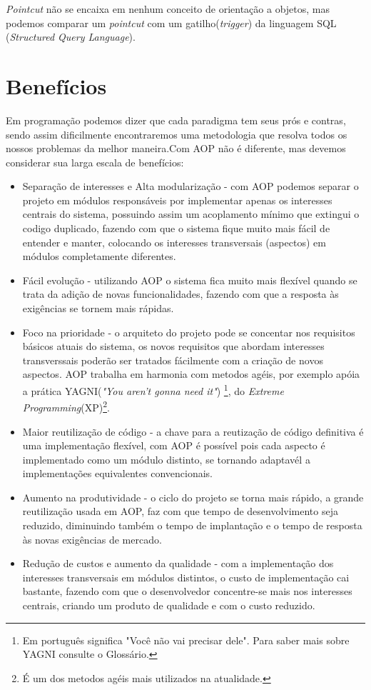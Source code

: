 \documentclass[tc,openright]{iiufrgs}
\begin{document}
\textit{Pointcut} não se encaixa em nenhum conceito de orientação a objetos, mas podemos comparar um \textit{pointcut} com um gatilho(\textit{trigger}) da linguagem SQL (\textit{Structured Query Language}).

\section{Benefícios}

Em programação podemos dizer que cada paradigma tem seus prós e contras, sendo assim dificilmente encontraremos uma metodologia que resolva todos os nossos problemas da melhor maneira.Com AOP não é diferente, mas devemos considerar sua larga escala de benefícios:

\begin{itemize}
\item Separação de interesses e Alta modularização - com AOP podemos separar o projeto em módulos responsáveis por implementar apenas os interesses centrais do sistema, possuindo assim um acoplamento mínimo que extingui o codigo duplicado, fazendo com que o sistema fique muito mais fácil de entender e manter, colocando os interesses transversais (aspectos) em módulos completamente diferentes.\cite{laddad2003aspectj} 
\item Fácil evolução - utilizando AOP o sistema fica muito mais flexível quando se trata da adição de novas funcionalidades, fazendo com que a resposta às exigências se tornem mais rápidas.
\item Foco na prioridade - o arquiteto do projeto pode se concentar nos requisitos básicos atuais do sistema, os novos requisitos que abordam interesses transverssais poderão ser tratados fácilmente com a criação de novos aspectos. AOP trabalha em harmonia com metodos agéis, por exemplo apóia a prática YAGNI(\textit{"You aren’t gonna need it"}) \footnote{Em português significa "Você não vai precisar dele". Para saber mais sobre YAGNI consulte o Glossário.}, do \textit{Extreme Programming}(XP)\footnote{É um dos metodos agéis mais utilizados na atualidade.}.\cite{laddad2003aspectj} 
\item Maior reutilização de código - a chave para a reutização de código definitiva é uma implementação flexível, com AOP é possível pois cada aspecto é implementado como um módulo distinto, se tornando adaptavél a implementações equivalentes convencionais.\cite{laddad2003aspectj} 
\item Aumento na produtividade - o ciclo do projeto se torna mais rápido, a grande reutilização usada em AOP, faz com que tempo de desenvolvimento seja reduzido, diminuindo também o tempo de implantação e o tempo de resposta às novas exigências de mercado. \cite{laddad2003aspectj} 
\item Redução de custos e aumento da qualidade - com a implementação dos interesses transversais em módulos distintos, o custo de implementação cai bastante, fazendo com que o desenvolvedor concentre-se mais nos interesses centrais, criando um produto de qualidade e com o custo reduzido.
\end{itemize}
\end{document}
